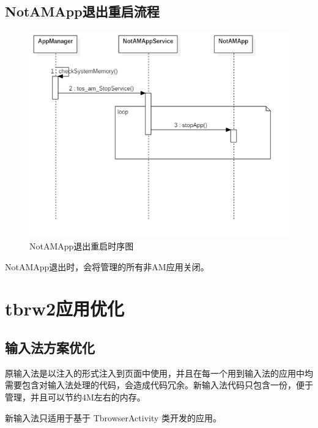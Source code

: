\subsection{NotAMApp退出重启流程}
\begin{figure}[H]
  \centering
  \includegraphics[width=\textwidth]{image/tbrw2_app_optimization/png/stop_not_am_app.png}
  \caption{NotAMApp退出重启时序图}
\end{figure}
NotAMApp退出时，会将管理的所有非AM应用关闭。


\section{tbrw2应用优化}
\subsection{输入法方案优化}
原输入法是以注入的形式注入到页面中使用，并且在每一个用到输入法的应用中均需要包含对输入法处理的代码，会造成代码冗余。新输入法代码只包含一份，便于管理，并且可以节约4M左右的内存。\par
新输入法只适用于基于 TbrowserActivity 类开发的应用。\par
